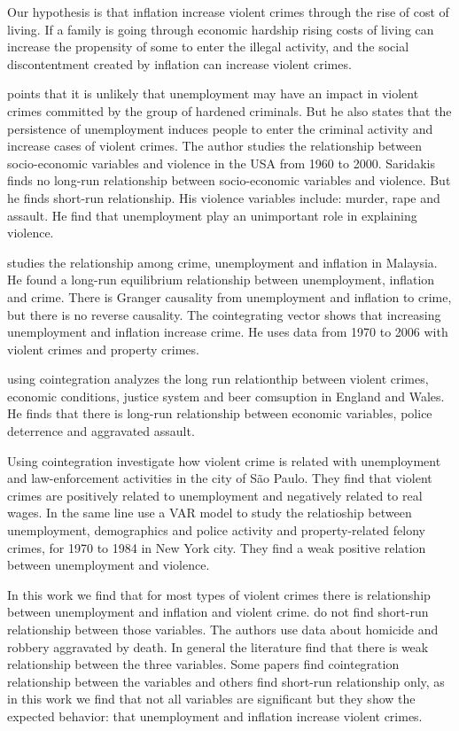 \documentclass[11pt, a4paper]{article}
\begin{document}
Our hypothesis is that inflation increase violent crimes through the rise of cost of living. If a family is going through economic hardship rising costs of living can increase the propensity of some to enter the illegal activity, and the social discontentment created by inflation can increase violent crimes.

\cite{saridakis2004} points that it is unlikely that unemployment may have an impact in violent crimes committed by the group of hardened criminals. But he also states that the persistence of unemployment induces people to enter the criminal activity and increase cases of violent crimes. The author studies the relationship between socio-economic variables and violence in the USA from 1960 to 2000.
Saridakis finds no long-run relationship between socio-economic variables and violence. But he finds short-run relationship. His violence variables include: murder, rape and assault. He find that unemployment play an unimportant role in explaining violence. 

\cite{tang2009} studies the relationship among crime, unemployment and inflation in Malaysia. He found a long-run equilibrium relationship between unemployment, inflation and crime. There is Granger causality from unemployment and inflation to crime, but there is no reverse causality. The cointegrating vector shows that increasing unemployment and inflation increase crime. He uses data from 1970 to 2006 with violent crimes and property crimes.


\cite{saridakis2011} using cointegration analyzes the long run relationthip between violent crimes, economic conditions, justice system and beer comsuption in England and Wales. He finds that there is long-run relationship between economic variables, police deterrence and aggravated assault. 

Using cointegration \cite{santos_kassouf2014} investigate how violent crime is related with unemployment and law-enforcement activities in the city of São Paulo. They find that violent crimes are positively related to unemployment and negatively related to real wages. In the same line
\cite{corman1987} use a VAR model to study the relatioship between unemployment, demographics and police activity and property-related felony crimes, for 1970 to 1984 in New York city. They find a weak positive relation between unemployment and violence.  

In this work we find that for most types of violent crimes there is relationship between unemployment and inflation and violent crime. \cite{santos_kassouf2014} do not find short-run relationship between those variables. The authors use data about homicide and robbery aggravated by death. 
In general the literature find that there is weak relationship between the three variables. 
Some papers find cointegration relationship between the variables and others find short-run relationship only, as in this work we find that not all variables are significant but they show the expected behavior: that unemployment and inflation increase violent crimes.
\end{document}
